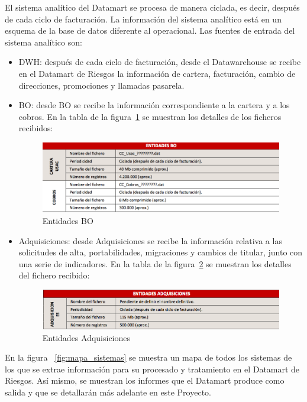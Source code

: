 \documentclass[a4paper, 12pt]{book}
\begin{document}
El sistema analítico del Datamart se procesa de manera ciclada, es decir, después de cada ciclo de facturación. La información del sistema analítico está en un esquema de la base de datos diferente al operacional. Las fuentes de entrada del sistema analítico son:
\begin{itemize}
	\item DWH: después de cada ciclo de facturación, desde el Datawarehouse se recibe en el Datamart de Riesgos la información de cartera, facturación, cambio de direcciones, promociones y llamadas pasarela.
	\item BO: desde BO se recibe la información correspondiente a la cartera y a los cobros. En la tabla de la figura~\ref{fig:entidades12} se muestran los detalles de los ficheros recibidos:

	\begin{figure}
	  \centering
	  \includegraphics[width=14cm, keepaspectratio]{img/entidades12}
	  \caption{Entidades BO}
	  \label{fig:entidades12}
	\end{figure}
	
	\item Adquisiciones: desde Adquisiciones se recibe la información relativa a las solicitudes de alta, portabilidades, migraciones y cambios de titular, junto con una serie de indicadores. En la tabla de la figura~\ref{fig:entidades13} se muestran los detalles del fichero recibido:

	\begin{figure}
	  \centering
	  \includegraphics[width=14cm, keepaspectratio]{img/entidades13}
	  \caption{Entidades Adquisiciones}
	  \label{fig:entidades13}
	\end{figure}
\end{itemize}

En la figura ~\ref{fig:mapa_sistemas} se muestra un mapa de todos los sistemas de los que se extrae información para su procesado y tratamiento en el Datamart de Riesgos. Así mismo, se muestran los informes que el Datamart produce como salida y que se detallarán más adelante en este Proyecto.
\end{document}
